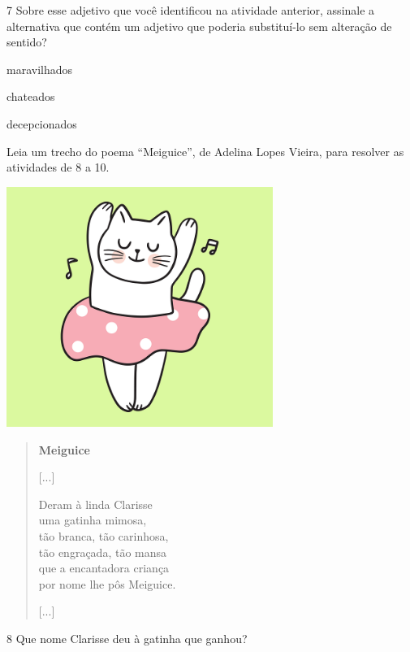 \num{7} Sobre esse adjetivo que você identificou na atividade anterior, assinale a alternativa que contém um adjetivo que poderia substituí-lo sem alteração de sentido?

\begin{boxlist}
\boxitem[X] maravilhados

\boxitem[] chateados

\boxitem[] decepcionados
\end{boxlist}

Leia um trecho do poema ``Meiguice'', de Adelina Lopes Vieira, para resolver as atividades de 8 a 10.

\includegraphics[width=3.41667in,height=3.07500in]{./media/image23.png}

\begin{verse}
\textbf{Meiguice}

{[}...{]}

Deram à linda Clarisse\\
uma gatinha mimosa,\\
tão branca, tão carinhosa,\\
tão engraçada, tão mansa\\
que a encantadora criança\\
por nome lhe pôs Meiguice.

{[}...{]}
\end{verse}


\num{8} Que nome Clarisse deu à gatinha que ganhou?


